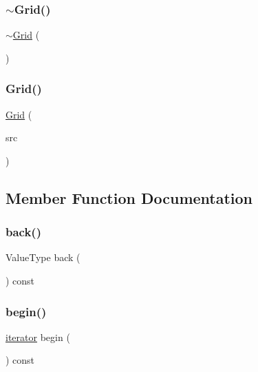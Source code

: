 \subsubsection{\texorpdfstring{$\sim$\+Grid()}{~Grid()}}
{\footnotesize\ttfamily $\sim$\mbox{\hyperlink{classGrid}{Grid}} (\begin{DoxyParamCaption}{ }\end{DoxyParamCaption})\hspace{0.3cm}{\ttfamily [virtual]}}

\mbox{\label{classGrid_aa5d57d67f0fd6f1565a863a794122a35}} 
\subsubsection{\texorpdfstring{Grid()}{Grid()}\hspace{0.1cm}{\footnotesize\ttfamily [5/5]}}
{\footnotesize\ttfamily \mbox{\hyperlink{classGrid}{Grid}} (\begin{DoxyParamCaption}\item[{const \mbox{\hyperlink{classGrid}{Grid}}$<$ Value\+Type $>$ \&}]{src }\end{DoxyParamCaption})\hspace{0.3cm}{\ttfamily [inline]}}



\subsection{Member Function Documentation}
\mbox{\label{classGrid_a38cbd80c93f450dc9bf3ca7c6a6220bd}} 
\subsubsection{\texorpdfstring{back()}{back()}}
{\footnotesize\ttfamily Value\+Type back (\begin{DoxyParamCaption}{ }\end{DoxyParamCaption}) const}

\mbox{\label{classGrid_a0c62c15c8ed609e7e5e9518cf5f5c712}} 
\subsubsection{\texorpdfstring{begin()}{begin()}}
{\footnotesize\ttfamily \mbox{\hyperlink{classGrid_1_1iterator}{iterator}} begin (\begin{DoxyParamCaption}{ }\end{DoxyParamCaption}) const\hspace{0.3cm}{\ttfamily [inline]}}

